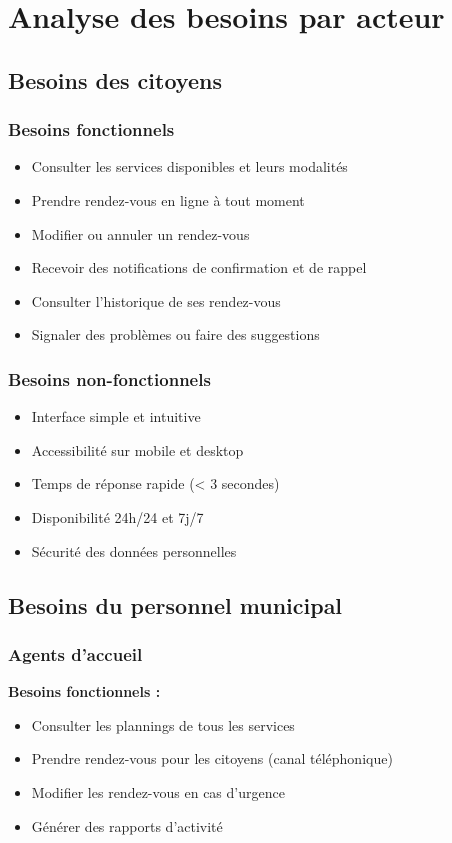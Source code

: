 \section{Analyse des besoins par acteur}

\subsection{Besoins des citoyens}

\subsubsection{Besoins fonctionnels}
\begin{itemize}
    \item Consulter les services disponibles et leurs modalités
    \item Prendre rendez-vous en ligne à tout moment
    \item Modifier ou annuler un rendez-vous
    \item Recevoir des notifications de confirmation et de rappel
    \item Consulter l'historique de ses rendez-vous
    \item Signaler des problèmes ou faire des suggestions
\end{itemize}

\subsubsection{Besoins non-fonctionnels}
\begin{itemize}
    \item Interface simple et intuitive
    \item Accessibilité sur mobile et desktop
    \item Temps de réponse rapide (< 3 secondes)
    \item Disponibilité 24h/24 et 7j/7
    \item Sécurité des données personnelles
\end{itemize}

\subsection{Besoins du personnel municipal}

\subsubsection{Agents d'accueil}
\textbf{Besoins fonctionnels :}
\begin{itemize}
    \item Consulter les plannings de tous les services
    \item Prendre rendez-vous pour les citoyens (canal téléphonique)
    \item Modifier les rendez-vous en cas d'urgence
    \item Générer des rapports d'activité
\end{itemize}

